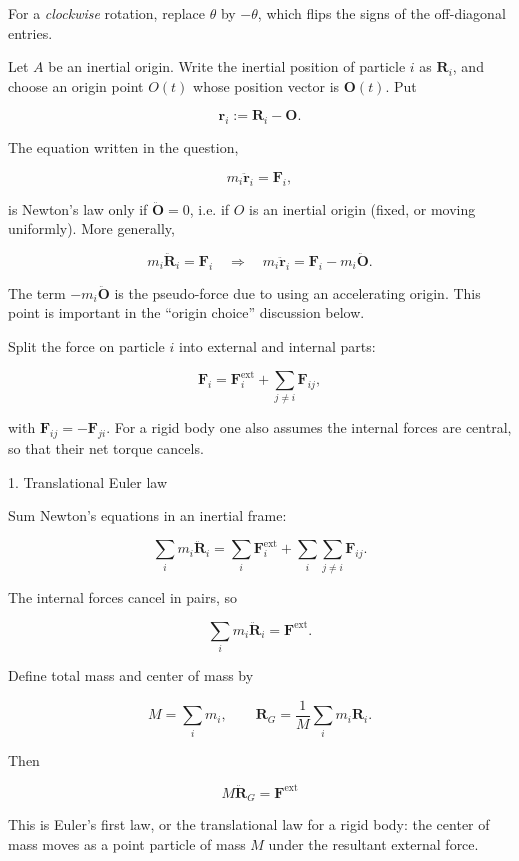 \documentclass[a4paper,11pt]{article}
\begin{document}
For a \emph{clockwise} rotation, replace \(\theta\) by \(-\theta\),
which flips the signs of the off-diagonal entries.

\hrulefill

Let \(A\) be an inertial origin. Write the inertial position of particle \(i\) as
\(\mathbf R_i\), and choose an origin point \(O(t)\) whose position vector is \(\mathbf O(t)\). Put

\[
\mathbf r_i:=\mathbf R_i-\mathbf O .
\]

The equation written in the question,

\[
m_i\ddot{\mathbf r}_i=\mathbf F_i,
\]

is Newton’s law only if \(\ddot{\mathbf O}=0\), i.e. if \(O\) is an inertial origin
(fixed, or moving uniformly). More generally,

\[
m_i\ddot{\mathbf R}_i=\mathbf F_i
\quad\Longrightarrow\quad
m_i\ddot{\mathbf r}_i=\mathbf F_i-m_i\ddot{\mathbf O}.
\]

The term \(-m_i\ddot{\mathbf O}\) is the pseudo-force due to using an accelerating origin. This point is important in the “origin choice” discussion below.

Split the force on particle \(i\) into external and internal parts:

\[
\mathbf F_i=\mathbf F_i^{\mathrm{ext}}+\sum_{j\ne i}\mathbf F_{ij},
\]

with \(\mathbf F_{ij}=-\mathbf F_{ji}\). For a rigid body one also assumes the internal forces are central, so that their net torque cancels.

\hrulefill

1. Translational Euler law

Sum Newton’s equations in an inertial frame:

\[
\sum_i m_i\ddot{\mathbf R}_i
=
\sum_i \mathbf F_i^{\mathrm{ext}}
+
\sum_i\sum_{j\ne i}\mathbf F_{ij}.
\]

The internal forces cancel in pairs, so

\[
\sum_i m_i\ddot{\mathbf R}_i=\mathbf F^{\mathrm{ext}}.
\]

Define total mass and center of mass by

\[
M=\sum_i m_i,\qquad
\mathbf R_G=\frac1M\sum_i m_i\mathbf R_i .
\]

Then

\[
\boxed{
M\ddot{\mathbf R}_G=\mathbf F^{\mathrm{ext}}
}
\]

This is Euler’s first law, or the translational law for a rigid body: the center of mass moves as a point particle of mass \(M\) under the resultant external force.
\end{document}
